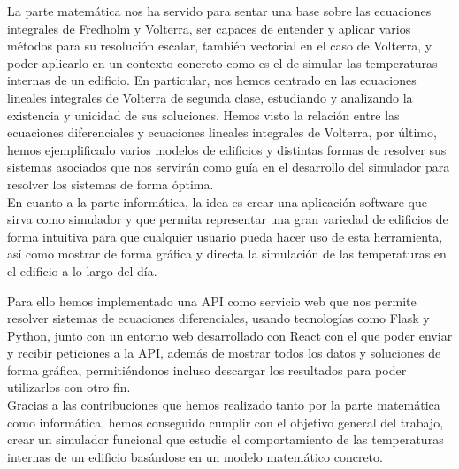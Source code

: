 La parte matemática nos ha servido para sentar una base sobre las ecuaciones integrales de Fredholm y Volterra, ser capaces de entender y aplicar varios métodos para su resolución escalar, también vectorial en el caso de Volterra, y poder aplicarlo en un contexto concreto como es el de simular las temperaturas internas de un edificio. En particular, nos hemos centrado en las ecuaciones lineales integrales de Volterra de segunda clase, estudiando y analizando la existencia y unicidad de sus soluciones. Hemos visto la relación entre las ecuaciones diferenciales y ecuaciones lineales integrales de Volterra, por último, hemos ejemplificado varios modelos de edificios y distintas formas de resolver sus sistemas asociados que nos servirán como guía en el desarrollo del simulador para resolver los sistemas de forma óptima.\\

En cuanto a la parte informática, la idea es crear una aplicación software que sirva como simulador y que permita representar una gran variedad de edificios de forma intuitiva para que cualquier usuario pueda hacer uso de esta herramienta, así como mostrar de forma gráfica y directa la simulación de las temperaturas en el edificio a lo largo del día.

Para ello hemos implementado una API como servicio web que nos permite resolver sistemas de ecuaciones diferenciales, usando tecnologías como Flask y Python, junto con un entorno web desarrollado con React con el que poder enviar y recibir peticiones a la API, además de mostrar todos los datos y soluciones de forma gráfica, permitiéndonos incluso descargar los resultados para poder utilizarlos con otro fin.\\

Gracias a las contribuciones que hemos realizado tanto por la parte matemática como informática, hemos conseguido cumplir con el objetivo general del trabajo, crear un simulador funcional que estudie el comportamiento de las temperaturas internas de un edificio basándose en un modelo matemático concreto.
